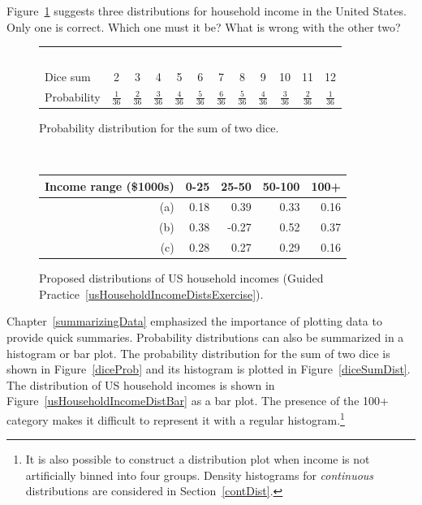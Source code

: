 \begin{exercisewrap}
\begin{nexercise}\label{usHouseholdIncomeDistsExercise}
Figure~\ref{usHouseholdIncomeDists} suggests three distributions for household income in the United States. Only one is correct. Which one must it be? What is wrong with the other two?\footnotemark
\end{nexercise}
\end{exercisewrap}

\begin{figure}[hhh]
\centering
\begin{tabular}{l ccc ccc ccc cc}
  \hline
  \ \vspace{-3mm} \\
Dice sum\vspace{0.3mm} & 2 & 3 & 4 & 5 & 6 & 7 & 8 & 9 & 10 & 11 & 12  \\
Probability & $\frac{1}{36}$ & $\frac{2}{36}$ & $\frac{3}{36}$ & $\frac{4}{36}$ & $\frac{5}{36}$ & $\frac{6}{36}$ & $\frac{5}{36}$ & $\frac{4}{36}$ & $\frac{3}{36}$ & $\frac{2}{36}$ & $\frac{1}{36}$\vspace{1mm} \\
   \hline
\end{tabular}
\caption{Probability distribution for the sum of two dice.}
\label{diceProb}
\ \\[5mm]
\begin{tabular}{r | rr rr}
  \hline
Income range (\$1000s) & 0-25    & 25-50    & 50-100     & 100+    \\
  \hline
(a)\hspace{0.2mm}	 & 0.18 & 0.39 & 0.33 & 0.16 \\
(b)				 & 0.38 & -0.27 & 0.52 & 0.37 \\
(c)\hspace{0.2mm}	 & 0.28 & 0.27 & 0.29 & 0.16 \\
  \hline
\end{tabular}
\caption{Proposed distributions of US household incomes (Guided Practice~\ref{usHouseholdIncomeDistsExercise}).}
\label{usHouseholdIncomeDists}
\end{figure}


Chapter~\ref{summarizingData} emphasized the importance of plotting data to provide quick summaries. Probability distributions can also be summarized in a histogram or bar plot. The probability distribution for the sum of two dice is shown in Figure~\ref{diceProb} and its histogram is plotted in Figure~\ref{diceSumDist}. The distribution of US household incomes is shown in Figure~\ref{usHouseholdIncomeDistBar} as a bar plot. The presence of the 100+ category makes it difficult to represent it with a regular histogram.\footnote{It is also possible to construct a distribution plot when income is not artificially binned into four groups. Density histograms for \emph{continuous} distributions are considered in Section~\ref{contDist}.}

